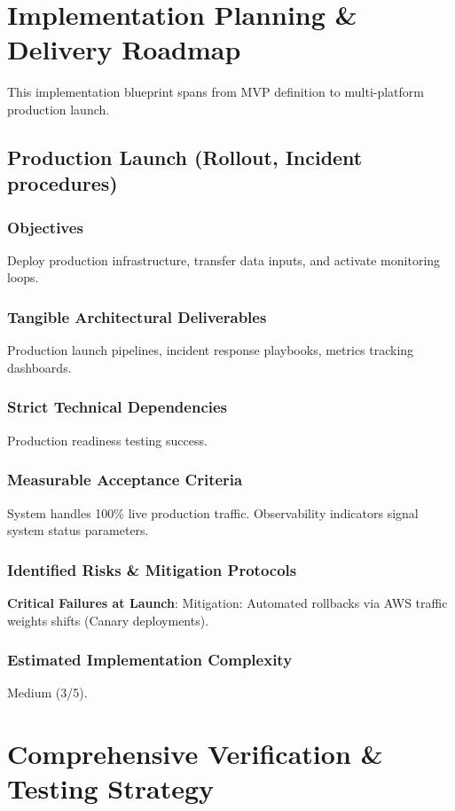 \documentclass[11pt,a4paper]{report}
\begin{document}

\chapter{Implementation Planning \& Delivery Roadmap}


This implementation blueprint spans from MVP definition to multi-platform production launch.

\section*{Production Launch (Rollout, Incident procedures)}
\subsection*{Objectives}
Deploy production infrastructure, transfer data inputs, and activate monitoring loops.
\subsection*{Tangible Architectural Deliverables}
Production launch pipelines, incident response playbooks, metrics tracking dashboards.
\subsection*{Strict Technical Dependencies}
Production readiness testing success.
\subsection*{Measurable Acceptance Criteria}
System handles 100\% live production traffic. Observability indicators signal system status parameters.
\subsection*{Identified Risks \& Mitigation Protocols}
\textbf{Critical Failures at Launch}: Mitigation: Automated rollbacks via AWS traffic weights shifts (Canary deployments).
\subsection*{Estimated Implementation Complexity}
Medium (3/5).


\chapter{Comprehensive Verification \& Testing Strategy}
\end{document}
